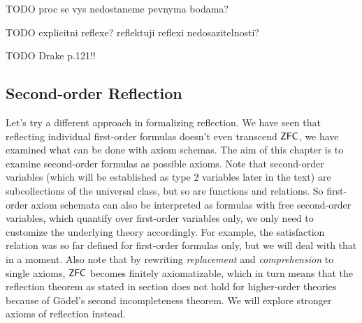 TODO proc se vys nedostaneme pevnyma bodama?

TODO explicitni reflexe? reflektuji reflexi nedosazitelnosti?

TODO Drake p.121!!






\subsection{Second-order Reflection} %
Let's try a different approach in formalizing reflection. We have seen that reflecting individual first-order formulas doesn't even transcend $\sf{ZFC}$, we have examined what can be done with axiom schemas. The aim of this chapter is to examine second-order formulas as possible axioms. Note that second-order variables (which will be established as type 2 variables later in the text) are subcollections of the universal class, but so are functions and relations. So first-order axiom schemata can also be interpreted as formulas with free second-order variables, which quantify over first-order variables only, we only need to customize the underlying theory accordingly. For example, the satisfaction relation was so far defined for first-order formulas only, but we will deal with that in a moment. Also note that by rewriting \emph{replacement} and \emph{comprehension} to single axioms, $\sf{ZFC}$ becomes finitely axiomatizable, which in turn means that the reflection theorem as stated in section \label{sec:first_order} does not hold for higher-order theories because of Gödel's second incompleteness theorem. We will explore stronger axioms of reflection instead.

